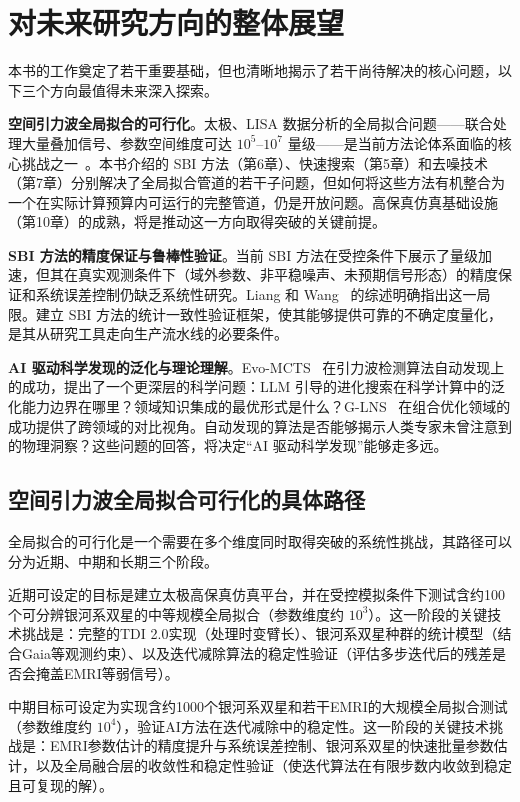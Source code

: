 \section{对未来研究方向的整体展望}

本书的工作奠定了若干重要基础，但也清晰地揭示了若干尚待解决的核心问题，以下三个方向最值得未来深入探索。

\textbf{空间引力波全局拟合的可行化}。太极、LISA 数据分析的全局拟合问题——联合处理大量叠加信号、参数空间维度可达 $10^5$--$10^7$ 量级——是当前方法论体系面临的核心挑战之一~\cite{wang2024challenges,du2026taiji}。本书介绍的 SBI 方法（第6章）、快速搜索（第5章）和去噪技术（第7章）分别解决了全局拟合管道的若干子问题，但如何将这些方法有机整合为一个在实际计算预算内可运行的完整管道，仍是开放问题。高保真仿真基础设施（第10章）的成熟，将是推动这一方向取得突破的关键前提。

\textbf{SBI 方法的精度保证与鲁棒性验证}。当前 SBI 方法在受控条件下展示了量级加速，但其在真实观测条件下（域外参数、非平稳噪声、未预期信号形态）的精度保证和系统误差控制仍缺乏系统性研究。Liang 和 Wang~\cite{liang2026sbireview} 的综述明确指出这一局限。建立 SBI 方法的统计一致性验证框架，使其能够提供可靠的不确定度量化，是其从研究工具走向生产流水线的必要条件。

\textbf{AI 驱动科学发现的泛化与理论理解}。Evo-MCTS~\cite{wang2025evomcts} 在引力波检测算法自动发现上的成功，提出了一个更深层的科学问题：LLM 引导的进化搜索在科学计算中的泛化能力边界在哪里？领域知识集成的最优形式是什么？G-LNS~\cite{zhao2025glns} 在组合优化领域的成功提供了跨领域的对比视角。自动发现的算法是否能够揭示人类专家未曾注意到的物理洞察？这些问题的回答，将决定“AI 驱动科学发现”能够走多远。

\subsection{空间引力波全局拟合可行化的具体路径}

全局拟合的可行化是一个需要在多个维度同时取得突破的系统性挑战，其路径可以分为近期、中期和长期三个阶段。

近期可设定的目标是建立太极高保真仿真平台，并在受控模拟条件下测试含约100个可分辨银河系双星的中等规模全局拟合（参数维度约 $10^3$）。这一阶段的关键技术挑战是：完整的TDI 2.0实现（处理时变臂长）、银河系双星种群的统计模型（结合Gaia等观测约束）、以及迭代减除算法的稳定性验证（评估多步迭代后的残差是否会掩盖EMRI等弱信号）。

中期目标可设定为实现含约1000个银河系双星和若干EMRI的大规模全局拟合测试（参数维度约 $10^4$），验证AI方法在迭代减除中的稳定性。这一阶段的关键技术挑战是：EMRI参数估计的精度提升与系统误差控制、银河系双星的快速批量参数估计，以及全局融合层的收敛性和稳定性验证（使迭代算法在有限步数内收敛到稳定且可复现的解）。

